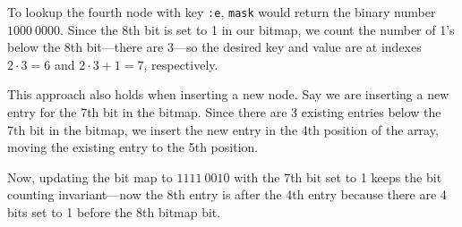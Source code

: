 \documentclass[preprint]{sigplanconf}
\begin{document}
To lookup the fourth node with key \texttt{:e},
\texttt{mask} would return the binary number
$1000\ 0000$.
Since the 8th bit is set to 1 in our bitmap,
we count the number of 1's below the 
8th bit---there are 3---so the desired key and value are at
indexes
$2\cdot3=6$
and
$2\cdot3+1=7$,
respectively.

This approach also holds when inserting a new node.
Say we are inserting a new entry
for the 7th bit in the bitmap.
Since there are 3 existing entries below
the 7th bit in the bitmap, we insert
the new entry in
the 4th position of the array, moving the 
existing entry to the 5th position.


Now, updating the bit map to $1111\ 0010$
with the 7th bit set to 1 keeps the bit counting
invariant---now the 8th entry is after the 4th
entry because there are 4 bits set to 1
before the 8th bitmap bit.
\end{document}
